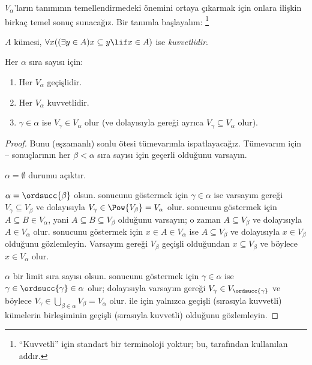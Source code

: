 


$V_\alpha$'ların tanımının temellendirmedeki önemini ortaya çıkarmak için
onlara ilişkin birkaç temel sonuç sunacağız. Bir tanımla başlayalım:
\footnote{``Kuvvetli'' için standart bir terminoloji yoktur; bu,
\citet{ButtonLT1} tarafından kullanılan addır.}
\begin{defn}
	$A$ kümesi, $\forall x((\exists y \in A)x \subseteq y \lif x \in A)$
	ise \emph{kuvvetlidir}.
\end{defn}
\begin{lem}
Her $\alpha$ sıra sayısı için:
\begin{enumerate}
	\item{} Her $V_\alpha$ geçişlidir.
	\item{} Her $V_\alpha$ kuvvetlidir.
	\item{} $\gamma \in \alpha$ ise $V_\gamma
	\in V_\alpha$ olur (ve dolayısıyla  gereği ayrıca
	$V_\gamma\subseteq V_\alpha$ olur).
\end{enumerate}
\end{lem}

\begin{proof}
Bunu (eşzamanlı) sonlu ötesi tümevarımla ispatlayacağız. Tümevarım için
-- sonuçlarının her $\beta<\alpha$
sıra sayısı için geçerli olduğunu varsayın.

$\alpha=\emptyset$ durumu açıktır.

$\alpha=\ordsucc{\beta}$ olsun.  sonucunu göstermek için
$\gamma\in\alpha$ ise varsayım gereği $V_\gamma\subseteq V_\beta$ ve
dolayısıyla $V_\gamma\in\Pow{V_\beta}=V_\alpha$ olur.
 sonucunu göstermek için
$A\subseteq B\in V_\alpha$, yani $A\subseteq B\subseteq V_\beta$
olduğunu varsayın; o zaman $A\subseteq V_\beta$ ve dolayısıyla
$A\in V_\alpha$ olur.  sonucunu göstermek için
$x\in A\in V_\alpha$ ise $A\subseteq V_\beta$ ve dolayısıyla
$x\in V_\beta$ olduğunu gözlemleyin. Varsayım gereği $V_\beta$ geçişli
olduğundan $x\subseteq V_\beta$ ve böylece $x\in V_\alpha$ olur.

$\alpha$ bir limit sıra sayısı olsun.  sonucunu göstermek
için $\gamma\in\alpha$ ise
$\gamma\in\ordsucc{\gamma}\in\alpha$ olur; dolayısıyla varsayım gereği
$V_\gamma\in V_{\ordsucc{\gamma}}$ ve böylece
$V_\gamma\in\bigcup_{\beta\in\alpha}V_\beta=V_\alpha$ olur.
 ile  için yalnızca geçişli
(sırasıyla kuvvetli) kümelerin birleşiminin geçişli (sırasıyla kuvvetli)
olduğunu gözlemleyin.
\end{proof}

